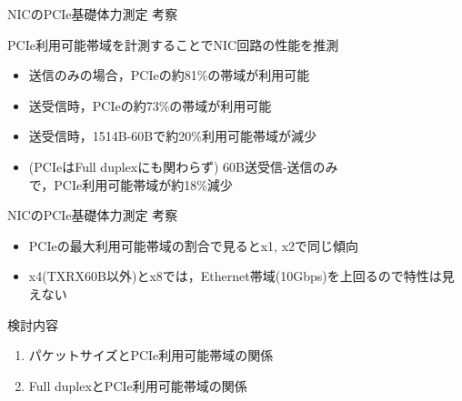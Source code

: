 \documentclass[10pt, compress]{beamer}
\begin{document}

\begin{frame}[fragile,t]{NICのPCIe基礎体力測定 考察}
	\vspace{-2em}
	\begin{figure}
		\resizebox{.8\textwidth}{!}{}
	\end{figure}
	\vspace{-1.5em}

	PCIe利用可能帯域を計測することでNIC回路の性能を推測
	\vspace{-.5em}
	\begin{itemize}
		\item 送信のみの場合，PCIeの約81\%の帯域が利用可能
		\item 送受信時，PCIeの約73\%の帯域が利用可能
		\item 送受信時，1514B-60Bで約20\%利用可能帯域が減少
		\item (PCIeはFull duplexにも関わらず) 60B送受信-送信のみ \\
		      で，PCIe利用可能帯域が約18\%減少
	\end{itemize}
\end{frame}


\begin{frame}[fragile,t]{NICのPCIe基礎体力測定 考察}
	\vspace{-2em}
	\begin{figure}
		\resizebox{.8\textwidth}{!}{}
	\end{figure}
	\vspace{-1.5em}

	\begin{itemize}
		\item PCIeの最大利用可能帯域の割合で見るとx1, x2で同じ傾向
		\item x4(TXRX60B以外)とx8では，Ethernet帯域(10Gbps)を上回るので特性は見えない
	\end{itemize}

	\hspace{-0.5em}検討内容
	\vspace{-.5em}
	\begin{enumerate}
		\item パケットサイズとPCIe利用可能帯域の関係
		\item Full duplexとPCIe利用可能帯域の関係
	\end{enumerate}
\end{frame}
\end{document}

